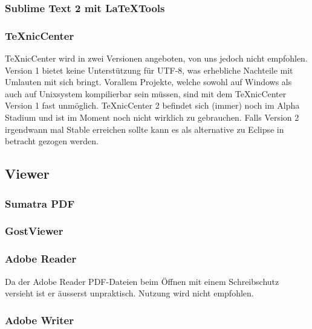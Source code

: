 \subsubsection{Sublime Text 2 mit LaTeXTools}

\subsubsection{TeXnicCenter}
TeXnicCenter wird in zwei Versionen angeboten, von uns jedoch nicht empfohlen. Version 1 bietet keine Unterstützung für UTF-8, was erhebliche Nachteile mit
Umlauten mit sich bringt. Vorallem Projekte, welche sowohl auf Windows als auch auf Unixsystem kompilierbar sein müssen, sind mit dem TeXnicCenter Version 1 fast unmöglich.
TeXnicCenter 2 befindet sich (immer) noch im Alpha Stadium und ist im Moment noch nicht wirklich zu gebrauchen. Falls Version 2 irgendwann mal Stable erreichen sollte kann es als
alternative zu Eclipse in betracht gezogen werden.


\subsection{Viewer}
\subsubsection{Sumatra PDF}
\subsubsection{GostViewer}
\subsubsection{Adobe Reader}
Da der Adobe Reader  PDF-Dateien beim Öffnen mit einem Schreibschutz versieht ist er äusserst unpraktisch. Nutzung wird nicht empfohlen.
\subsubsection{Adobe Writer}
